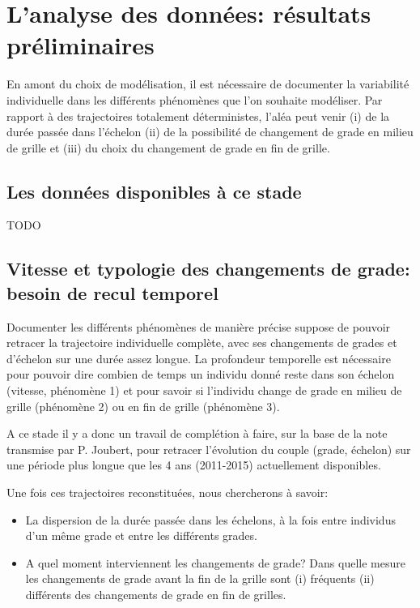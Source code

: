 \documentclass[11pt,a4paper]{article}
\begin{document}
\else \fi



\section{L'analyse des données: résultats préliminaires}

En amont du choix de modélisation, il est nécessaire de documenter la variabilité individuelle dans les différents phénomènes que l'on souhaite modéliser. Par rapport à des trajectoires totalement déterministes, l'aléa peut venir (i) de la durée passée dans l'échelon (ii) de la possibilité de changement de grade en milieu de grille et (iii) du choix du changement de grade en fin de grille. 

\subsection{Les données disponibles à ce stade}

TODO

\subsection{Vitesse et typologie des changements de grade: besoin de recul temporel}

Documenter les différents phénomènes de manière précise suppose de pouvoir retracer la trajectoire individuelle complète, avec ses changements de grades et d'échelon sur une durée assez longue. La profondeur temporelle est nécessaire pour pouvoir dire combien de temps un individu donné reste dans son échelon (vitesse, phénomène 1) et pour savoir si l'individu change de grade en milieu de grille (phénomène 2) ou en fin de grille (phénomène 3). 

A ce stade il y a donc un travail de complétion à faire, sur la base de la note transmise par P. Joubert, pour retracer l'évolution du couple (grade, échelon) sur une période plus longue que les 4 ans (2011-2015) actuellement disponibles. 

Une fois ces trajectoires reconstituées, nous chercherons à savoir: 
\begin{itemize}[leftmargin=1cm ,parsep=0cm,itemsep=0cm,topsep=0cm] 
\item La dispersion de la durée passée dans les échelons, à la fois entre individus d'un même grade et entre les différents grades. 
\item A quel moment interviennent les changements de grade? Dans quelle mesure les changements de grade avant la fin de la grille sont (i) fréquents (ii) différents des changements de grade en fin de grilles. 
\end{itemize}
\end{document}
